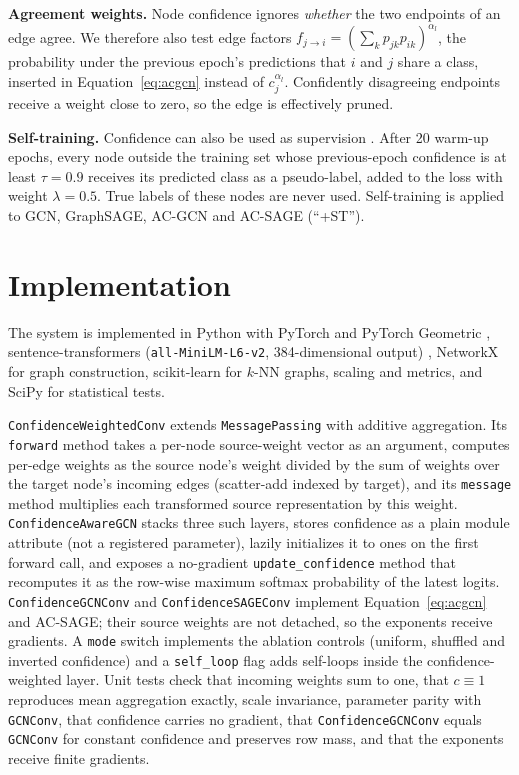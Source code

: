 \documentclass{csimq}
\begin{document}
\textbf{Agreement weights.} Node confidence ignores \emph{whether} the two endpoints of an edge agree. We therefore also test edge factors $f_{j\rightarrow i}=(\sum_k p_{jk}p_{ik})^{\alpha_l}$, the probability under the previous epoch's predictions that $i$ and $j$ share a class, inserted in Equation~\eqref{eq:acgcn} instead of $c_j^{\alpha_l}$. Confidently disagreeing endpoints receive a weight close to zero, so the edge is effectively pruned.

\textbf{Self-training.} Confidence can also be used as supervision \cite{lee2013pseudo,li2018deeper}. After 20 warm-up epochs, every node outside the training set whose previous-epoch confidence is at least $\tau=0.9$ receives its predicted class as a pseudo-label, added to the loss with weight $\lambda=0.5$. True labels of these nodes are never used. Self-training is applied to GCN, GraphSAGE, AC-GCN and AC-SAGE (``+ST'').

\section{Implementation}

The system is implemented in Python with PyTorch and PyTorch Geometric \cite{fey2019pyg}, sentence-transformers (\texttt{all-MiniLM-L6-v2}, 384-dimensional output) \cite{reimers2019sbert}, NetworkX for graph construction, scikit-learn for $k$-NN graphs, scaling and metrics, and SciPy for statistical tests.

\texttt{ConfidenceWeightedConv} extends \texttt{MessagePassing} with additive aggregation. Its \texttt{forward} method takes a per-node source-weight vector as an argument, computes per-edge weights as the source node's weight divided by the sum of weights over the target node's incoming edges (scatter-add indexed by target), and its \texttt{message} method multiplies each transformed source representation by this weight. \texttt{ConfidenceAwareGCN} stacks three such layers, stores confidence as a plain module attribute (not a registered parameter), lazily initializes it to ones on the first forward call, and exposes a no-gradient \texttt{update\_confidence} method that recomputes it as the row-wise maximum softmax probability of the latest logits. \texttt{ConfidenceGCNConv} and \texttt{ConfidenceSAGEConv} implement Equation~\eqref{eq:acgcn} and AC-SAGE; their source weights are not detached, so the exponents receive gradients. A \texttt{mode} switch implements the ablation controls (uniform, shuffled and inverted confidence) and a \texttt{self\_loop} flag adds self-loops inside the confidence-weighted layer. Unit tests check that incoming weights sum to one, that $c\equiv1$ reproduces mean aggregation exactly, scale invariance, parameter parity with \texttt{GCNConv}, that confidence carries no gradient, that \texttt{ConfidenceGCNConv} equals \texttt{GCNConv} for constant confidence and preserves row mass, and that the exponents receive finite gradients.
\end{document}
